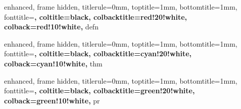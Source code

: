 
{
    enhanced,
    frame hidden,
    titlerule=0mm,
    toptitle=1mm,
    bottomtitle=1mm,
    fonttitle=\bfseries\large,
    coltitle=black,
    colbacktitle=red!20!white,
    colback=red!10!white,
}{defn}



{
    enhanced,
    frame hidden,
    titlerule=0mm,
    toptitle=1mm,
    bottomtitle=1mm,
    fonttitle=\bfseries\large,
    coltitle=black,
    colbacktitle=cyan!20!white,
    colback=cyan!10!white,
}{thm}



{
    enhanced,
    frame hidden,
    titlerule=0mm,
    toptitle=1mm,
    bottomtitle=1mm,
    fonttitle=\bfseries\large,
    coltitle=black,
    colbacktitle=green!20!white,
    colback=green!10!white,
}{pr}


